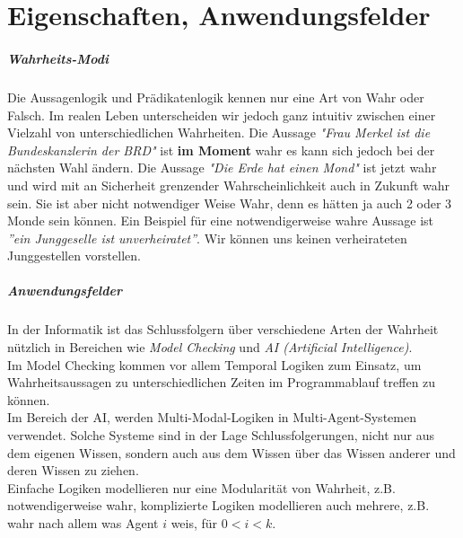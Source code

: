 
\chapter{Eigenschaften, Anwendungsfelder} %
\label{sec:eigenschaften_anwendungsfelder}

\paragraph{Wahrheits-Modi} %
\label{par:wahrheits_modi}

Die Aussagenlogik und Prädikatenlogik kennen nur eine Art von Wahr oder Falsch. Im realen Leben unterscheiden wir jedoch ganz intuitiv zwischen einer Vielzahl von unterschiedlichen Wahrheiten.
Die Aussage \emph{"Frau Merkel ist die Bundeskanzlerin der BRD"} ist \textbf{im Moment} wahr es kann sich jedoch bei der nächsten Wahl ändern.
Die Aussage \emph{"Die Erde hat einen Mond"} ist jetzt wahr und wird mit an Sicherheit grenzender Wahrscheinlichkeit auch in Zukunft wahr sein. 
Sie ist aber nicht notwendiger Weise Wahr, denn es hätten ja auch 2 oder 3 Monde sein können.
Ein Beispiel für eine notwendigerweise wahre Aussage ist \emph{''ein Junggeselle ist unverheiratet''}. Wir können uns keinen verheirateten Junggestellen vorstellen.


\paragraph{Anwendungsfelder} %
\label{par:anwendungsfelder}

In der Informatik ist das Schlussfolgern über verschiedene Arten der Wahrheit nützlich in Bereichen wie \emph{Model Checking} und \emph{AI (Artificial Intelligence)}. \\
Im Model Checking kommen vor allem Temporal Logiken zum Einsatz, um Wahrheitsaussagen zu unterschiedlichen Zeiten im Programmablauf treffen zu können. \\
Im Bereich der AI, werden Multi-Modal-Logiken in Multi-Agent-Systemen verwendet. 
Solche Systeme sind in der Lage Schlussfolgerungen, nicht nur aus dem eigenen Wissen, sondern auch aus dem Wissen über das Wissen anderer und deren Wissen zu ziehen.\\
Einfache Logiken modellieren nur eine Modularität von Wahrheit, z.B. notwendigerweise wahr, komplizierte Logiken modellieren auch mehrere, z.B. wahr nach allem was Agent $i$ weis, für $ 0 < i < k$. \cite[S.306f]{huth2004logic}\\


